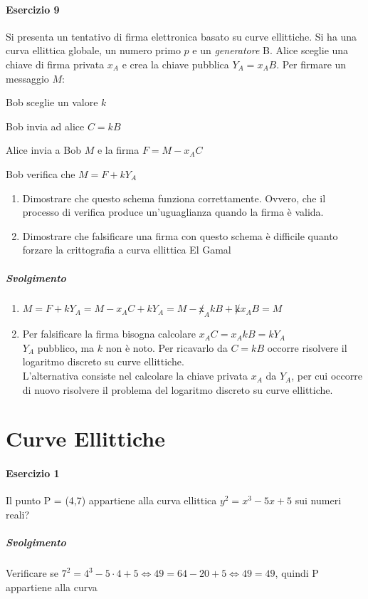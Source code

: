 \documentclass[10pt]{book}
\begin{document}
\paragraph{Esercizio 9} Si presenta un tentativo di firma elettronica basato su curve ellittiche. Si ha una curva ellittica globale, un numero primo $p$ e un \textit{generatore} B. Alice sceglie una chiave di firma privata $x_A$ e crea la chiave pubblica $Y_A = x_AB$. Per firmare un messaggio $M$:
\begin{list}{}{}
	\item Bob sceglie un valore $k$
	\item Bob invia ad alice $C = kB$
	\item Alice invia a Bob $M$ e la firma $F = M - x_AC$
	\item Bob verifica che $M = F + kY_A$
\end{list}
\begin{enumerate}
	\item Dimostrare che questo schema funziona correttamente. Ovvero, che il processo di verifica produce un'uguaglianza quando la firma è valida.
	\item Dimostrare che falsificare una firma con questo schema è difficile quanto forzare la crittografia a curva ellittica El Gamal
\end{enumerate}
\subparagraph{Svolgimento} \begin{enumerate}
	\item $M = F + kY_A = M - x_AC + kY_A = M - \not x_AkB + \not kx_AB = M$
	\item Per falsificare la firma bisogna calcolare $x_AC = x_A k B = k Y_A$\\
	$Y_A$ pubblico, ma $k$ non è noto. Per ricavarlo da $C = kB$ occorre risolvere il logaritmo discreto su curve ellittiche.\\
	L'alternativa consiste nel calcolare la chiave privata $x_A$ da $Y_A$, per cui occorre di nuovo risolvere il problema del logaritmo discreto su curve ellittiche.
\end{enumerate}
\section{Curve Ellittiche}
\paragraph{Esercizio 1} Il punto P = (4,7) appartiene alla curva ellittica $y^2 = x^3 - 5x + 5$ sui numeri reali?
\subparagraph{Svolgimento} Verificare se $7^2 = 4^3 - 5\cdot4 + 5 \Leftrightarrow 49 = 64-20+5 \Leftrightarrow 49 = 49$, quindi P appartiene alla curva
\end{document}
